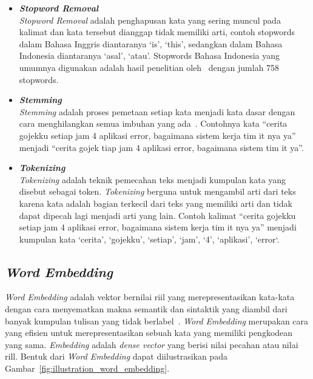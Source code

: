 \begin{itemize}
      \item \emph{\bfseries \emph{Stopword Removal}}\\
      \emph{Stopword Removal} adalah penghapusan kata yang sering muncul pada
      kalimat dan kata tersebut dianggap tidak memiliki arti, contoh stopwords dalam Bahasa
      Inggris diantaranya `is', `this', sedangkan dalam Bahasa Indonesia diantaranya `asal', `atau'.
      Stopwords Bahasa Indonesia yang umumnya digunakan adalah hasil penelitian oleh~\citet{Tala2003ASO}
      dengan jumlah 758 stopwords.
      
      \item \emph{\bfseries \emph{Stemming}}\\
      \emph{Stemming} adalah proses pemetaan setiap kata menjadi kata dasar dengan
      cara menghilangkan semua imbuhan yang ada~\citep{Singh2016}. Contohnya kata “cerita gojekku
      setiap jam 4 aplikasi error, bagaimana sistem kerja tim it nya ya” menjadi “cerita gojek tiap
      jam 4 aplikasi error, bagaimana sistem tim it ya”.
      
      \item \emph{\bfseries \emph{Tokenizing}}\\
      \emph{Tokenizing} adalah teknik pemecahan teks menjadi kumpulan kata yang disebut sebagai 
      token. \emph{Tokenizing} berguna untuk mengambil arti dari teks karena kata adalah bagian
      terkecil dari teks yang memiliki arti dan tidak dapat dipecah lagi menjadi arti yang lain.
      Contoh kalimat “cerita gojekku setiap jam 4 aplikasi error, bagaimana sistem kerja tim it
      nya ya” menjadi kumpulan kata `cerita', `gojekku', `setiap', `jam', `4', `aplikasi',
      `error`.

\end{itemize}

\subsection{\emph{Word Embedding}}
\emph{Word Embedding} adalah vektor bernilai riil yang merepresentasikan kata-kata dengan cara
menyematkan makna semantik dan sintaktik yang diambil dari banyak kumpulan tulisan yang tidak
berlabel~\citep{Wang2019}. \emph{Word Embedding} merupakan cara yang efisien untuk merepresentasikan
sebuah kata yang memiliki pengkodean yang sama. \emph{Embedding} adalah \emph{dense vector} yang
berisi nilai pecahan atau nilai rill. Bentuk dari \emph{Word Embedding} dapat diilustrasikan pada
Gambar~\ref{fig:illustration_word_embedding}.

